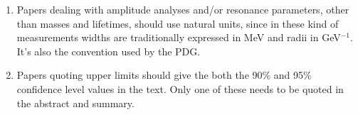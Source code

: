 \begin{enumerate}
\item Papers dealing with amplitude analyses and/or resonance parameters, 
      other than masses and lifetimes, should use natural units,
      since in these kind of measurements widths are traditionally 
      expressed in MeV and radii in GeV$^{-1}$. It's also the convention
      used by the PDG. 

\item Papers quoting upper limits should give the both the 90\% and
  95\% confidence level values in the text. Only one of these needs to
  be quoted in the abstract and summary.
\end{enumerate}
